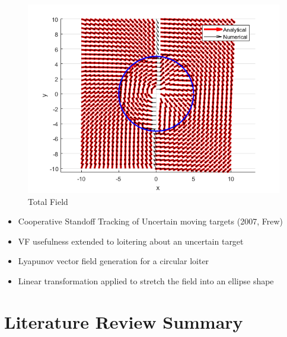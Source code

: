 \documentclass[numbered,pdftex]{ohio-etd}
\begin{document}
\begin{figure}[h]
	\centering
	\includegraphics[width=0.7\linewidth]{PaperFigures/total}
	\caption{Total Field}
	\label{fig:total}
\end{figure}

\begin{itemize}
	\item Cooperative Standoff Tracking of Uncertain moving targets (2007, Frew)
	\item VF usefulness extended to loitering about an uncertain target
	\item Lyapunov vector field generation for a circular loiter
	\item Linear transformation applied to stretch the field into an ellipse shape
\end{itemize}





\section{Literature Review Summary}

   

\end{document}
